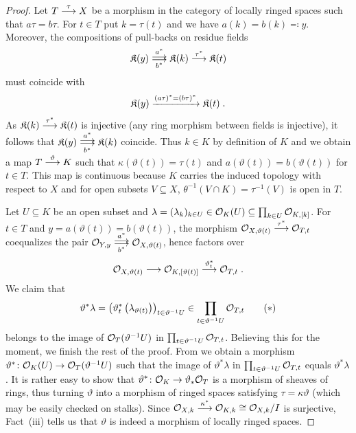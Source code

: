 \documentclass[a4paper,parskip=half,numbers=enddot, DIV=12]{scrreprt}
\begin{document}
\begin{proof}
	Let $T\morphism[\tau]X$ be a morphism in the category of locally ringed spaces such that $a\tau=b\tau$. For $t\in T$ put $k=\tau(t)$ and we have $a(k)=b(k)\eqqcolon y$. Moreover, the compositions of pull-backs on residue fields
	\begin{align*}
		\KK(y)\doublemorphism[\smash{a^*}][\smash{b^*}]\KK(k)\morphism[\tau^*]\KK(t)
	\end{align*}
	must coincide with
	\begin{align*}
		\mathfrak{K}(y)\xrightarrow{(a\tau)^*=(b\tau)^*}\mathfrak{K}(t)\;.
	\end{align*}
	As $\KK(k)\morphism[\tau^*]\KK(t)$ is injective (any ring morphism between fields is injective), it follows that $\KK(y)\doublemorphism[a^*][b^*]\KK(k)$ coincide. Thus $k\in K$ by definition of $K$ and we obtain a map $T\morphism[\vartheta]K$ such that $\kappa(\vartheta(t))=\tau(t)$ and $a(\vartheta(t))=b(\vartheta(t))$ for $t\in T$. This map is continuous because $K$ carries the induced topology with respect to $X$ and for open subsets $V\subseteq X$, $\theta^{-1}(V\cap K)=\tau^{-1}(V)$ is open in $T$.
	
	Let $U\subseteq K$ be an open subset and $\lambda=(\lambda_k)_{k\in U}\in\mathcal{O}_K(U)\subseteq\prod_{k\in U}\mathcal{O}_{K,[k]}$. For $t\in T$ and $y=a(\vartheta(t))=b(\vartheta(t))$, the morphism $\Oo_{X,\vartheta(t)}\morphism[\tau^*]\Oo_{T,t}$ coequalizes the pair $\Oo_{Y,y}\doublemorphism[\smash{a^*}][\smash{b^*}]\Oo_{X,\vartheta(t)}$, hence factors over
	\begin{align*}
		\Oo_{X,\vartheta(t)}\morphism\Oo_{K,[\vartheta(t)]}\morphism[\vartheta^*_t]\Oo_{T,t}\;.
	\end{align*}
	We claim that
	\begin{align}\lbl{eq:bruteForcePullback}
		\vartheta^*\lambda=\left(\vartheta^*_t\left(\lambda_{\vartheta(t)}\right)\right)_{t\in\vartheta^{-1}U}\in\prod_{t\in\vartheta^{-1}U}\Oo_{T,t}\tag{$*$}
	\end{align}
	belongs to the image of $\mathcal{O}_T(\vartheta^{-1}U)$ in $\prod_{t\in\vartheta^{-1}U}\mathcal{O}_{T,t}$. Believing this for the moment, we finish the rest of the proof. From  we obtain a morphism $\vartheta^*\colon\Oo_K(U)\morphism\Oo_T(\vartheta^{-1}U)$ such that the image of $\vartheta^*\lambda$ in $\prod_{t\in\vartheta^{-1}U}\mathcal{O}_{T,t}$ equals $\vartheta^*\lambda$. It is rather easy to show that $\vartheta^*\colon\Oo_K\morphism\vartheta_*\Oo_T$ is a morphism of sheaves of rings, thus turning $\vartheta$ into a morphism of ringed spaces satisfying $\tau=\kappa\vartheta$ (which may be easily checked on stalks). Since $\Oo_{X,k}\morphism[\kappa^*]\Oo_{K,k}\cong\Oo_{X,k}/I$ is surjective, Fact~(iii) tells us that $\vartheta$ is indeed a morphism of locally ringed spaces.
	

\end{proof}
\end{document}
